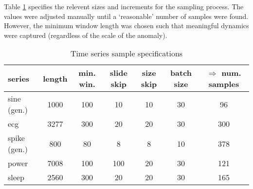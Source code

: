 Table \ref{tbl:winspec} specifies the relevent sizes and increments for the sampling process.
%
The values were adjusted manually until a `reasonable' number of samples were found.
%
However, the minimum window length was chosen such that meaningful dynamics were captured (regardless of the scale of the anomaly).

\begin{table}[H]
\centering
\begin{tabular}{|l||c|c|c|c|c||c|}
  \hline
  series & length & min. win. & slide skip & size skip & batch size & $\Rightarrow$ num. samples
  \\ \hline \hline
  sine (gen.) & 1000 & 100 & 10 & 10 & 30 & 96 
  \\ \hline
  ecg \cite{PhysioNet} & 3277 & 300 & 20 & 20 & 30 & 300
  \\ \hline
  spike (gen.) & 800 & 80 & 8 & 8 & 10 & 378
  \\ \hline
  power \cite{Keogh2005} & 7008 & 100 & 100 & 20 & 30 & 121
  \\ \hline
  sleep \cite{this} & 2560 & 300 & 20 & 20 & 30 & 165
  \\ \hline
\end{tabular}
\caption[]{Time series sample specifications} %
\label{tbl:winspec}
\end{table}



    













